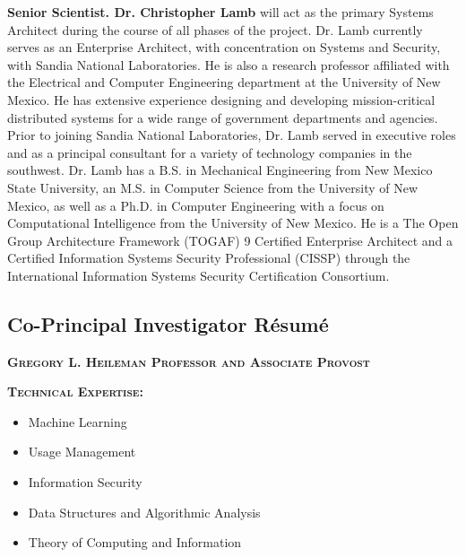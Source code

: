 \documentclass{sbir}
\begin{document}
{\vspace{-8pt}
{\bf Senior Scientist. Dr. Christopher Lamb} will act as the primary Systems Architect during the course of all phases of the project. Dr. Lamb currently serves as an Enterprise Architect, with concentration on Systems and Security, with Sandia National Laboratories. He is also a research professor affiliated with the Electrical and Computer Engineering department at the University of New Mexico. He has extensive experience designing and developing mission-critical distributed systems for a wide range of government departments and agencies. Prior to joining Sandia National Laboratories, Dr. Lamb served in executive roles and as a principal consultant for a variety of technology companies in the southwest. Dr. Lamb has a B.S. in Mechanical Engineering from New Mexico State University, an M.S. in Computer Science from the University of New Mexico, as well as a Ph.D. in Computer Engineering with a focus on Computational Intelligence from the University of New Mexico. He is a The Open Group Architecture Framework (TOGAF) 9 Certified Enterprise Architect and a Certified Information Systems Security Professional (CISSP) through the International Information Systems Security Certification Consortium.

\subsection{Co-Principal Investigator R\'esum\'e}\label{GLH}

\textbf{\textsc{Gregory L. Heileman \hfill Professor and Associate Provost}}

\vspace{-18pt}
{\textcolor{black}{\makebox[6.5in]{\hrulefill}} 
\textbf{\textsc{Technical Expertise:}}
\vspace{-8pt}
\begin{multicols}{2}
 \begin{itemize}
  \item Machine Learning
  \item Usage Management
  \item Information Security
  \item Data Structures and Algorithmic Analysis
  \item Theory of Computing and Information	
 \end{itemize}
\end{multicols}

}}
\end{document}
